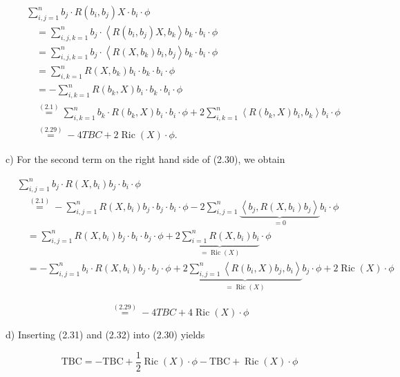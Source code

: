 \documentclass[10pt, letterpaper]{article}
\begin{document}
$$
\begin{aligned}
& \sum_{i, j=1}^{n} b_{j} \cdot R\left(b_{i}, b_{j}\right) X \cdot b_{i} \cdot \phi \\
& \quad=\sum_{i, j, k=1}^{n} b_{j} \cdot\left\langle R\left(b_{i}, b_{j}\right) X, b_{k}\right\rangle b_{k} \cdot b_{i} \cdot \phi \\
& \quad=\sum_{i, j, k=1}^{n} b_{j} \cdot\left\langle R\left(X, b_{k}\right) b_{i}, b_{j}\right\rangle b_{k} \cdot b_{i} \cdot \phi \\
& \quad=\sum_{i, k=1}^{n} R\left(X, b_{k}\right) b_{i} \cdot b_{k} \cdot b_{i} \cdot \phi \\
& \quad=-\sum_{i, k=1}^{n} R\left(b_{k}, X\right) b_{i} \cdot b_{k} \cdot b_{i} \cdot \phi \\
& \quad \stackrel{(2.1)}{=} \sum_{i, k=1}^{n} b_{k} \cdot R\left(b_{k}, X\right) b_{i} \cdot b_{i} \cdot \phi+2 \sum_{i, k=1}^{n}\left\langle R\left(b_{k}, X\right) b_{i}, b_{k}\right\rangle b_{i} \cdot \phi \\
& \quad \stackrel{(2.29)}{=}-4 T B C+2 \operatorname{Ric}(X) \cdot \phi .
\end{aligned}
$$

c) For the second term on the right hand side of (2.30), we obtain

$$
\begin{aligned}
& \sum_{i, j=1}^{n} b_{j} \cdot R\left(X, b_{i}\right) b_{j} \cdot b_{i} \cdot \phi \\
& \quad \stackrel{(2.1)}{=}-\sum_{i, j=1}^{n} R\left(X, b_{i}\right) b_{j} \cdot b_{j} \cdot b_{i} \cdot \phi-2 \sum_{i, j=1}^{n} \underbrace{\left\langle b_{j}, R\left(X, b_{i}\right) b_{j}\right\rangle}_{=0} b_{i} \cdot \phi \\
& \quad=\sum_{i, j=1}^{n} R\left(X, b_{i}\right) b_{j} \cdot b_{i} \cdot b_{j} \cdot \phi+2 \underbrace{\sum_{i=1}^{n} R\left(X, b_{i}\right) b_{i}}_{=\operatorname{Ric}(X)} \cdot \phi \\
& \quad=-\sum_{i, j=1}^{n} b_{i} \cdot R\left(X, b_{i}\right) b_{j} \cdot b_{j} \cdot \phi+2 \underbrace{\sum_{i, j=1}^{n}\left\langle R\left(b_{i}, X\right) b_{j}, b_{i}\right\rangle}_{=\operatorname{Ric}(X)} b_{j} \cdot \phi+2 \operatorname{Ric}(X) \cdot \phi
\end{aligned}
$$

$$
\stackrel{(2.29)}{=}-4 T B C+4 \operatorname{Ric}(X) \cdot \phi
$$

d) Inserting (2.31) and (2.32) into (2.30) yields

$$
\mathrm{TBC}=-\mathrm{TBC}+\frac{1}{2} \operatorname{Ric}(X) \cdot \phi-\mathrm{TBC}+\operatorname{Ric}(X) \cdot \phi
$$
\end{document}
